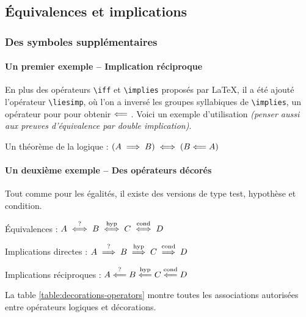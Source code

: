 \documentclass[12pt,a4paper]{article}
\begin{document}

\subsection{Équivalences et implications}

\subsubsection{Des symboles supplémentaires}

\paragraph{Un premier exemple -- Implication réciproque}

En plus des opérateurs \verb+\iff+ et \verb+\implies+ proposés par \LaTeX{}, il a été ajouté l'opérateur \verb+\liesimp+, où l'on a inversé les groupes syllabiques de \verb+\implies+, un opérateur pour pour obtenir $\mathrel{\Longleftarrow}$ . Voici un exemple d'utilisation \emph{(penser aussi aux preuves d'équivalence par double implication)}.

\begin{tcblisting}{}
Un théorème de la logique : $(A \implies B) \iff (B \liesimp A)$
\end{tcblisting}



\paragraph{Un deuxième exemple -- Des opérateurs décorés}

Tout comme pour les égalités, il existe des versions de type test, hypothèse et condition.

\begin{tcblisting}{}
Équivalences : $A \ifftest B \iffhyp C \iffcond D$

Implications directes : $A \impliestest B \implieshyp C \impliescond D$

Implications réciproques : $A \liesimptest B \liesimphyp C \liesimpcond D$
\end{tcblisting}


\begin{remark}
	La table \ref{table:decorations-operators}  montre toutes les associations autorisées entre opérateurs logiques et décorations.
\end{remark}
\end{document}
